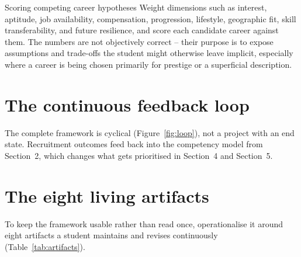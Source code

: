 \documentclass{reportkit}
\begin{document}
\begin{decisionpoint}{Scoring competing career hypotheses}
Weight dimensions such as interest, aptitude, job availability, compensation,
progression, lifestyle, geographic fit, skill transferability, and future
resilience, and score each candidate career against them. The numbers are not
objectively correct -- their purpose is to expose assumptions and trade-offs the
student might otherwise leave implicit, especially where a career is being chosen
primarily for prestige or a superficial description.
\end{decisionpoint}

\section{The continuous feedback loop}
The complete framework is cyclical (Figure~\ref{fig:loop}), not a project with an
end state. Recruitment outcomes feed back into the competency model from
Section~2, which changes what gets prioritised in Section~4 and Section~5.

\begin{diagram}[
  type=cycle,
  caption={The career exploration feedback loop.},
  label={fig:loop},
  source={Illustrative conceptual cycle.},
  description={Six stages arranged in a ring, each connected to the next, looping back to the first: explore careers, research market, assess self, build evidence, enter recruitment, update hypothesis.}
]

\end{diagram}

\section{The eight living artifacts}
To keep the framework usable rather than read once, operationalise it around eight
artifacts a student maintains and revises continuously (Table~\ref{tab:artifacts}).
\end{document}
